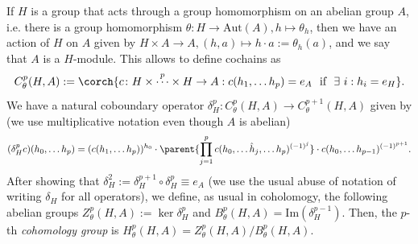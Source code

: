 If \(H\) is a group that acts through a group homomorphism on an abelian group \(A\), i.e. there is a group homomorphism \(\theta\colon H \to \mathrm{Aut}(A), h \mapsto \theta_h\), then we have an action of \(H\) on \(A\) given by \(H \times A \to A, (h,a) \mapsto h \cdot a:=\theta_h(a)\), and we say that \(A\) is a \(H\)-module. This allows to define cochains as 
\[
C^p_\theta(H, A):=\corch{c\colon H \times \overset{p}{\cdots} \times H \to A: c(h_1, \ldots h_p)=e_A \ \ \text{if} \ \ \exists\  i :h_i=e_H}.
\] 
We have a natural coboundary operator \(\delta_H^p\colon C^p_\theta(H, A) \to C^{p+1}_\theta(H, A)\) given by (we use multiplicative notation even though \(A\) is abelian)
\begin{align}
    (\delta_H^p c)(h_0, \ldots h_p) = (c(h_1, \ldots h_p))^{h_0} \cdot \parent{\prod_{j=1}^pc(h_0, \ldots \hat{h}_j, \ldots h_p)^{(-1)^j}}\cdot c(h_0, \ldots h_{p-1})^{(-1)^{p+1}}.
\end{align}
After showing that \(\delta_H^2:=\delta_H^{p+1}\circ \delta_H^p\equiv e_A\) (we use the usual abuse of notation of writing \(\delta_H\) for all operators), we define, as usual in coholomogy, the following abelian groups \(Z_\theta^p(H, A):=\ker{\delta_H^p}\) and \(B_\theta^p(H, A)=\mathrm{Im}(\delta_H^{p-1})\). Then, the \(p\)-th \textit{cohomology group} is \(H_\theta^p(H,A)=Z_\theta^p(H,A)/B_\theta^p(H, A)\).  \\

